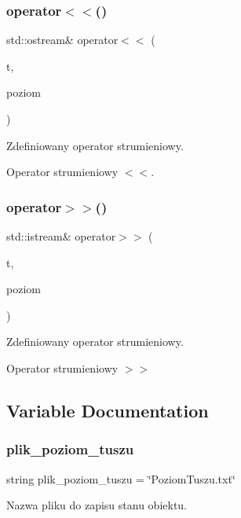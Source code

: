 \subsubsection{operator$<$$<$()}
{\footnotesize\ttfamily std\+::ostream\& operator$<$$<$ (\begin{DoxyParamCaption}\item[{std\+::ostream \&}]{t,  }\item[{\textbf{ Poziom\+Tuszu} \&}]{poziom }\end{DoxyParamCaption})}



Zdefiniowany operator strumieniowy. 

Operator strumieniowy $<$$<$. \mbox{\label{_poziom_tuszu_8cpp_ada6562c289860a5a222b70d7b83864c5}} 
\subsubsection{operator$>$$>$()}
{\footnotesize\ttfamily std\+::istream\& operator$>$$>$ (\begin{DoxyParamCaption}\item[{std\+::istream \&}]{t,  }\item[{\textbf{ Poziom\+Tuszu} \&}]{poziom }\end{DoxyParamCaption})}



Zdefiniowany operator strumieniowy. 

Operator strumieniowy $>$$>$ 

\subsection{Variable Documentation}
\mbox{\label{_poziom_tuszu_8cpp_aa8ffdcf14798d2542b3eb62cbfce754c}} 
\subsubsection{plik\+\_\+poziom\+\_\+tuszu}
{\footnotesize\ttfamily string plik\+\_\+poziom\+\_\+tuszu = \char`\"{}Poziom\+Tuszu.\+txt\char`\"{}}



Nazwa pliku do zapisu stanu obiektu. 

